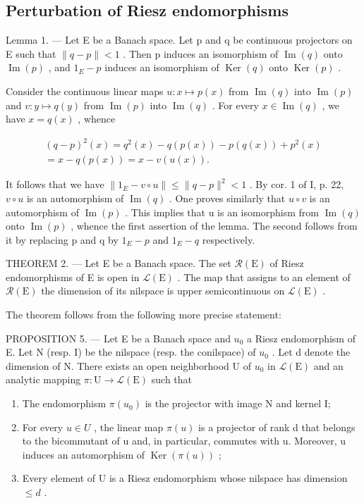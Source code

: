 \subsection{Perturbation of Riesz endomorphisms}

Lemma 1. --- Let E be a Banach space. Let p and q be continuous projectors on E such that \(\|q - p\| < 1\) . Then p induces an isomorphism of \(\operatorname{Im}(q)\) onto \(\operatorname{Im}(p)\) , and \(1_{E} - p\) induces an isomorphism of \(\operatorname{Ker}(q)\) onto \(\operatorname{Ker}(p)\) .

Consider the continuous linear maps \(u\colon x\mapsto p(x)\) from \(\operatorname{Im}(q)\) into \(\operatorname{Im}(p)\) and \(v\colon y\mapsto q(y)\) from \(\operatorname{Im}(p)\) into \(\operatorname{Im}(q)\) . For every \(x\in\operatorname{Im}(q)\) , we have \(x=q(x)\) , whence

\[
\begin{array}{c} (q - p) ^ {2} (x) = q ^ {2} (x) - q (p (x)) - p (q (x)) + p ^ {2} (x) \\ = x - q (p (x)) = x - v (u (x)). \end{array}
\]

It follows that we have \(\|1_{E}-v\circ u\|\leqslant\|q-p\|^{2}<1\) . By cor. 1 of I, p. 22, \(v\circ u\) is an automorphism of \(\operatorname{Im}(q)\) . One proves similarly that \(u\circ v\) is an automorphism of \(\operatorname{Im}(p)\) . This implies that u is an isomorphism from \(\operatorname{Im}(q)\) onto \(\operatorname{Im}(p)\) , whence the first assertion of the lemma. The second follows from it by replacing p and q by \(1_{E}-p\) and \(1_{E}-q\) respectively.

THEOREM 2. --- Let E be a Banach space. The set \(\mathcal{R}(\mathrm{E})\) of Riesz endomorphisms of E is open in \(\mathcal{L}(\mathrm{E})\) . The map that assigns to an element of \(\mathcal{R}(\mathrm{E})\) the dimension of its nilspace is upper semicontinuous on \(\mathcal{L}(\mathrm{E})\) .

The theorem follows from the following more precise statement:

PROPOSITION 5. --- Let E be a Banach space and \(u_{0}\) a Riesz endomorphism of E. Let N (resp. I) be the nilspace (resp. the conilspace) of \(u_{0}\) . Let d denote the dimension of N. There exists an open neighborhood U of \(u_{0}\) in \(\mathcal{L}(\mathrm{E})\) and an analytic mapping \(\pi\colon\mathrm{U}\to\mathcal{L}(\mathrm{E})\) such that

\begin{enumerate}
\def\labelenumi{(\roman{enumi})}
\item
  The endomorphism \(\pi(u_0)\) is the projector with image N and kernel I;
\item
  For every \(u \in U\) , the linear map \(\pi(u)\) is a projector of rank d that belongs to the bicommutant of u and, in particular, commutes with u. Moreover, u induces an automorphism of \(\operatorname{Ker}(\pi(u))\) ;
\item
  Every element of U is a Riesz endomorphism whose nilspace has dimension \(\leqslant d\) .
\end{enumerate}

